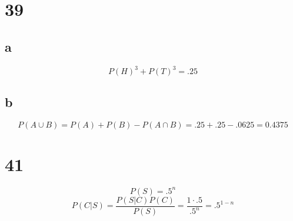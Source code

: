 \documentclass[12pt]{article}
\begin{document}
  \section*{39}
  \subsection*{a}
  $$ P(H)^3 + P(T)^3 = .25 $$
  \subsection*{b}
  $$ P(A \cup B) = P(A) + P(B) - P(A \cap B) = .25 + .25 - .0625 = 0.4375 $$

  \section*{41}
  $$ P(S) = .5^n $$
  $$ P(C | S) = \frac{P(S | C)P(C)}{P(S)} = \frac{1 \cdot .5}{.5^n} = .5^{1-n}$$
\end{document}
